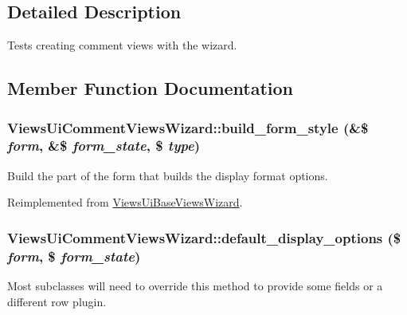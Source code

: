\subsection{Detailed Description}
Tests creating comment views with the wizard. 

\subsection{Member Function Documentation}
\hypertarget{classViewsUiCommentViewsWizard_aadb538fde884a2f60dc25abd7a3e01e1}{
\subsubsection[{build\_\-form\_\-style}]{\setlength{\rightskip}{0pt plus 5cm}ViewsUiCommentViewsWizard::build\_\-form\_\-style (\&\$ {\em form}, \/  \&\$ {\em form\_\-state}, \/  \$ {\em type})}}
\label{classViewsUiCommentViewsWizard_aadb538fde884a2f60dc25abd7a3e01e1}
Build the part of the form that builds the display format options. 

Reimplemented from \hyperlink{classViewsUiBaseViewsWizard_ac467f4635ccfcf169406f8c90c4e985c}{ViewsUiBaseViewsWizard}.\hypertarget{classViewsUiCommentViewsWizard_ab644e65b579971fca2ea8c66405f805f}{
\subsubsection[{default\_\-display\_\-options}]{\setlength{\rightskip}{0pt plus 5cm}ViewsUiCommentViewsWizard::default\_\-display\_\-options (\$ {\em form}, \/  \$ {\em form\_\-state})}}
\label{classViewsUiCommentViewsWizard_ab644e65b579971fca2ea8c66405f805f}
Most subclasses will need to override this method to provide some fields or a different row plugin. 

